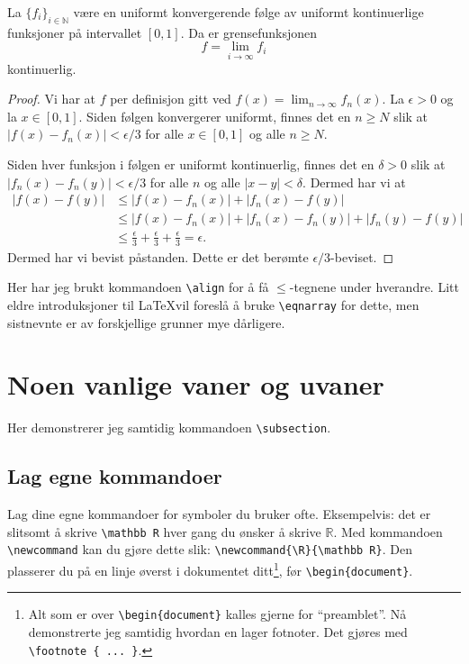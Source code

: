 \documentclass[a4paper, norsk]{article}  %
\newcommand{\R}{\mathbb{R}}
\newcommand{\N}{\mathbb{N}}
\begin{document}
\begin{thm}
La $\{ f_i \}_{i \in \N}$ være en uniformt konvergerende følge av uniformt kontinuerlige funksjoner på intervallet $[0,1]$. Da er grensefunksjonen
\[
\label{limitfunction}
f = \lim_{i \to \infty} f_i
\]
kontinuerlig. 
\end{thm}
\begin{proof}
Vi har at $f$ per definisjon gitt ved $f(x) = \lim_{n \to \infty} f_n(x)$.  La $\epsilon > 0$ og la $x \in [0,1]$. Siden følgen konvergerer uniformt, finnes det en $n \geq N$ slik at $\lvert f(x)-f_n(x) \rvert < \epsilon/3$ for alle $x \in [0,1]$ og alle $n \geq N$.

Siden hver funksjon i følgen er uniformt kontinuerlig, finnes det en $\delta > 0$ slik at $\lvert f_n(x)-f_n(y) \rvert < \epsilon/3$ for alle $n$ og alle $\lvert x - y \rvert < \delta$. Dermed har vi at
\begin{align*}
  \lvert f(x) - f(y) \rvert &\leq \lvert f(x) - f_n(x) \rvert + \lvert f_n(x) - f(y) \rvert \\
&\leq \lvert f(x) - f_n(x) \rvert + \lvert f_n(x) - f_n(y) \rvert + \lvert f_n(y) - f(y) \rvert\\ 
&\leq \frac \epsilon 3 + \frac \epsilon 3 + \frac \epsilon 3 = \epsilon.
\end{align*}
Dermed har vi bevist påstanden. Dette er det berømte $\epsilon/3$-beviset.
\end{proof}

Her har jeg brukt kommandoen \texttt{\textbackslash align} for å få $\leq$-tegnene under hver\-andre. Litt eldre introduksjoner til \LaTeX vil foreslå å bruke \texttt{\textbackslash eqnarray} for dette, men sistnevnte er av forskjellige grunner mye dårligere. 

\section{Noen vanlige vaner og uvaner}
\label{seksjonvaner}

Her demonstrerer jeg samtidig kommandoen \verb|\subsection|.

\subsection{Lag egne kommandoer}

Lag dine egne kommandoer for symboler du bruker ofte. Eksempelvis: det er slitsomt å skrive \verb|\mathbb R| hver gang du ønsker å skrive $\mathbb R$. Med kommandoen \verb|\newcommand| kan du gjøre dette slik: \verb|\newcommand{\R}{\mathbb R}|. Den plasserer du på en linje øverst i dokumentet ditt\footnote{Alt som er over \texttt{\textbackslash begin\{document\}} kalles gjerne for ``preamblet''. Nå demonstrerte jeg samtidig hvordan en lager fotnoter. Det gjøres med \texttt{\textbackslash footnote \{ ... \}}.}, før \verb|\begin{document}|.
\end{document}
